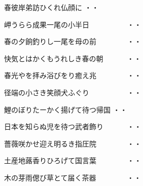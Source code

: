 \vspace{0.6cm}
\begin{shiika}春彼岸弟訪ひくれ仏顔に
\hfill{・・}\end{shiika}
\vspace{0.6cm}
\begin{shiika}岬うらら成果一尾の小半日　　　　　
\hfill{・・}\end{shiika}
\vspace{0.6cm}
\begin{shiika}春の夕餉釣りし一尾を母の前　　　　
\hfill{・・}\end{shiika}
\vspace{0.6cm}
\begin{shiika}快気とはかくもうれしき春の朝　　　
\hfill{・・}\end{shiika}
\vspace{0.6cm}
\begin{shiika}春光やを拝み浴びをり癒え兆　　　　
\hfill{・・}\end{shiika}
\vspace{0.6cm}
\begin{shiika}径端の小さき笑顔犬ふぐり　　　　　
\hfill{・・}\end{shiika}
\vspace{0.6cm}
\begin{shiika}鯉のぼりたーかく揚げて待つ帰国
\hfill{・・}\end{shiika}
\vspace{0.6cm}
\begin{shiika}日本を知らぬ児を待つ武者飾り　　　
\hfill{・・}\end{shiika}
\vspace{0.6cm}
\begin{shiika}薔薇咲かせ迎え明るき指圧院　　　　
\hfill{・・}\end{shiika}
\vspace{0.6cm}
\begin{shiika}土産地蕗香りひろげて国言葉　　　　
\hfill{・・}\end{shiika}
\vspace{0.6cm}
\begin{shiika}木の芽雨偲び草とて届く茶器　　　　
\hfill{・・}\end{shiika}
